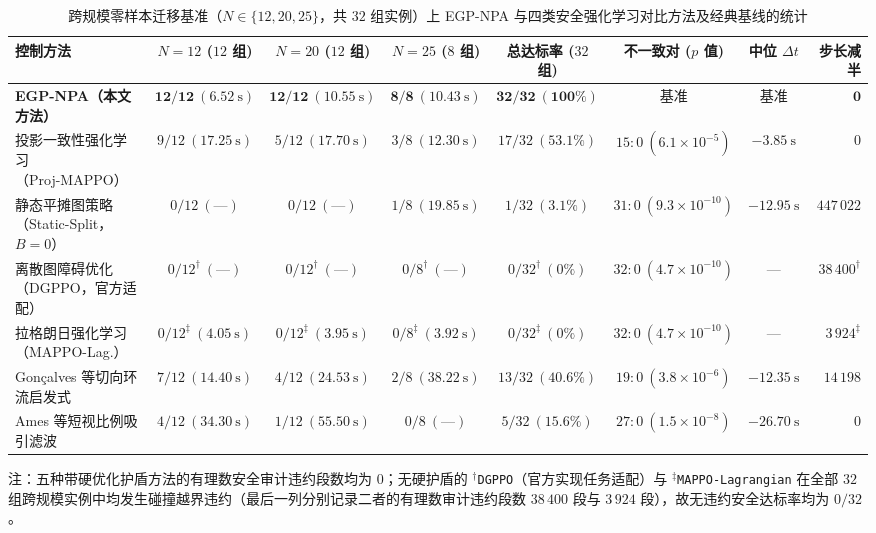 \begin{table}[t]
 \centering\footnotesize
 \caption{跨规模零样本迁移基准（$N\in\{12,20,25\}$，共 $32$ 组实例）上 EGP-NPA 与四类安全强化学习对比方法及经典基线的统计}\label{tab:e2}
 \begin{tabularx}{\textwidth}{@{}Xccccccr@{}}
 \toprule
 控制方法 & $N=12$ ($12$ 组) & $N=20$ ($12$ 组) & $N=25$ ($8$ 组) & 总达标率 ($32$ 组) & 不一致对 ($p$ 值) & 中位 $\Delta t$ & 步长减半\\
 \midrule
 \textbf{EGP-NPA（本文方法）} & $\mathbf{12/12\ (6.52\ \mathrm s)}$ & $\mathbf{12/12\ (10.55\ \mathrm s)}$ & $\mathbf{8/8\ (10.43\ \mathrm s)}$ & $\mathbf{32/32\ (100\%)}$ & 基准 & 基准 & $\mathbf{0}$\\
 投影一致性强化学习\cite{wabersich2021,liu2026saferl}（Proj-MAPPO） & $9/12\ (17.25\ \mathrm s)$ & $5/12\ (17.70\ \mathrm s)$ & $3/8\ (12.30\ \mathrm s)$ & $17/32\ (53.1\%)$ & $15:0\ (6.1\times 10^{-5})$ & $-3.85\ \mathrm s$ & $0$\\
 静态平摊图策略\cite{ames2017cbf,zhang2025gcbf}（Static-Split，$B=0$） & $0/12\ (\text{---})$ & $0/12\ (\text{---})$ & $1/8\ (19.85\ \mathrm s)$ & $1/32\ (3.1\%)$ & $31:0\ (9.3\times 10^{-10})$ & $-12.95\ \mathrm s$ & $447\,022$\\
 离散图障碍优化\cite{zhang2025dgppo}（DGPPO，官方适配） & $0/12^\dagger\ (\text{---})$ & $0/12^\dagger\ (\text{---})$ & $0/8^\dagger\ (\text{---})$ & $0/32^\dagger\ (0\%)$ & $32:0\ (4.7\times 10^{-10})$ & --- & $38\,400^\dagger$\\
 拉格朗日强化学习\cite{gu2023safe}（MAPPO-Lag.） & $0/12^\ddagger\ (4.05\ \mathrm s)$ & $0/12^\ddagger\ (3.95\ \mathrm s)$ & $0/8^\ddagger\ (3.92\ \mathrm s)$ & $0/32^\ddagger\ (0\%)$ & $32:0\ (4.7\times 10^{-10})$ & --- & $3\,924^\ddagger$\\
 Gon\c{c}alves 等\cite{goncalves2023circulation}切向环流启发式 & $7/12\ (14.40\ \mathrm s)$ & $4/12\ (24.53\ \mathrm s)$ & $2/8\ (38.22\ \mathrm s)$ & $13/32\ (40.6\%)$ & $19:0\ (3.8\times 10^{-6})$ & $-12.35\ \mathrm s$ & $14\,198$\\
 Ames 等\cite{ames2017cbf,reis2021}短视比例吸引滤波 & $4/12\ (34.30\ \mathrm s)$ & $1/12\ (55.50\ \mathrm s)$ & $0/8\ (\text{---})$ & $5/32\ (15.6\%)$ & $27:0\ (1.5\times 10^{-8})$ & $-26.70\ \mathrm s$ & $0$\\
 \bottomrule
 \end{tabularx}
 \vspace{1.5pt}
 \par\raggedright\scriptsize 注：五种带硬优化护盾方法的有理数安全审计违约段数均为 $0$；无硬护盾的 $^\dagger$\texttt{DGPPO}（官方实现任务适配）与 $^\ddagger$\texttt{MAPPO-Lagrangian} 在全部 $32$ 组跨规模实例中均发生碰撞越界违约（最后一列分别记录二者的有理数审计违约段数 $38\,400$ 段与 $3\,924$ 段），故无违约安全达标率均为 $0/32$。
\end{table}

